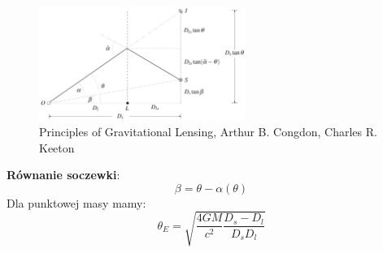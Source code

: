 \documentclass{beamer}
\begin{document}
\begin{frame}
    \begin{figure}
        \centering
        \includegraphics[width=0.6\textwidth]{Screenshot from 2024-06-10 13-41-41.png}
        \caption*{\tiny{Principles of Gravitational
                Lensing, Arthur B. Congdon, Charles R. Keeton\cite{Congdon2018}}}
    \end{figure}
    \textbf{Równanie soczewki}:
    \[\beta = \theta - \alpha(\theta)\]
    Dla punktowej masy mamy\cite{Schneider1992}:
    \[\theta_E = \sqrt{\frac{4GM}{c^2}\frac{D_s-D_l}{D_s D_l}}\]
\end{frame}
\end{document}
